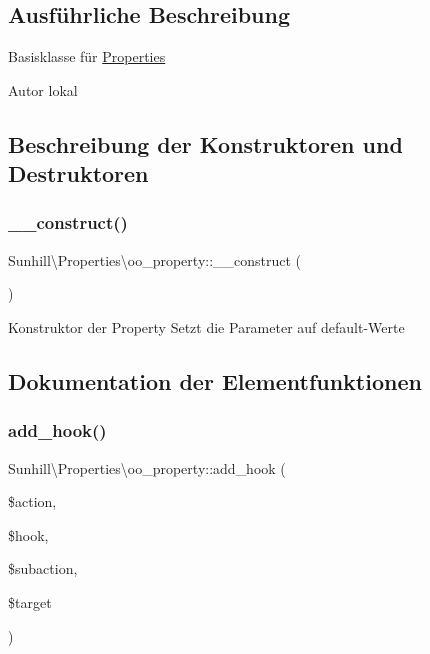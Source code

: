 \subsection{Ausführliche Beschreibung}
Basisklasse für \hyperlink{namespaceSunhill_1_1Properties}{Properties} \begin{DoxyAuthor}{Autor}
lokal 
\end{DoxyAuthor}


\subsection{Beschreibung der Konstruktoren und Destruktoren}
\mbox{\label{classSunhill_1_1Properties_1_1oo__property_a6b1a7e1df63cdee5c3d58625f968ed04}} 
\subsubsection{\texorpdfstring{\+\_\+\+\_\+construct()}{\_\_construct()}}
{\footnotesize\ttfamily Sunhill\textbackslash{}\+Properties\textbackslash{}oo\+\_\+property\+::\+\_\+\+\_\+construct (\begin{DoxyParamCaption}{ }\end{DoxyParamCaption})}

Konstruktor der Property Setzt die Parameter auf default-\/\+Werte 

\subsection{Dokumentation der Elementfunktionen}
\mbox{\label{classSunhill_1_1Properties_1_1oo__property_a95b8b57fb873f0a0a1a9ab76d1764265}} 
\subsubsection{\texorpdfstring{add\+\_\+hook()}{add\_hook()}}
{\footnotesize\ttfamily Sunhill\textbackslash{}\+Properties\textbackslash{}oo\+\_\+property\+::add\+\_\+hook (\begin{DoxyParamCaption}\item[{}]{\$action,  }\item[{}]{\$hook,  }\item[{}]{\$subaction,  }\item[{}]{\$target }\end{DoxyParamCaption})}

